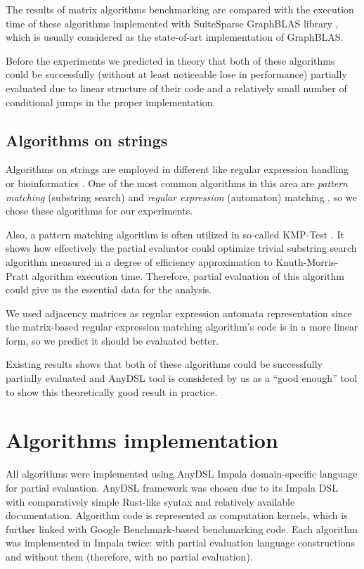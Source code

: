 \documentclass[conference]{IEEEtran}
\begin{document}
The results of matrix algorithms benchmarking are compared with the execution time of these algorithms implemented with SuiteSparse GraphBLAS library \cite{moreira2018implementing}, which is usually considered as the state-of-art implementation of GraphBLAS.

Before the experiments we predicted in theory that both of these algorithms could be successfully (without at least noticeable lose in performance) partially evaluated due to linear structure of their code and a relatively small number of conditional jumps in the proper implementation.


\subsection{Algorithms on strings}

Algorithms on strings are employed in different like regular expression handling or bioinformatics \cite{rajesh2010unusual}. One of the most common algorithms in this area are \textit{pattern matching} (substring search) and \textit{regular expression} (automaton) matching \cite{cormen2009introduction}, so we chose these algorithms for our experiments.

Also, a pattern matching algorithm is often utilized in so-called KMP-Test \cite{jones1993partial}. It shows how effectively the partial evaluator could optimize trivial substring search algorithm measured in a degree of efficiency approximation to Knuth-Morris-Pratt algorithm execution time. Therefore, partial evaluation of this algorithm could give us the essential data for the analysis.

We used adjacency matrices as regular expression automata representation since the matrix-based regular expression matching algorithm's code is in a more linear form, so we predict it should be evaluated better.

Existing results \cite{jones1993partial} shows that both of these algorithms could be successfully partially evaluated and AnyDSL tool is considered by us as a ``good enough'' tool to show this theoretically good result in practice.

\section{Algorithms implementation}

All algorithms were implemented using AnyDSL Impala domain-specific language \cite{leissa2018anydsl} for partial evaluation. AnyDSL framework was chosen due to its Impala DSL with comparatively simple Rust-like syntax and relatively available documentation. Algorithm code is represented as computation kernels, which is further linked with Google Benchmark-based \cite{gbenchmark} benchmarking code. Each algorithm was implemented in Impala twice: with partial evaluation language constructions and without them (therefore, with no partial evaluation).
\end{document}
